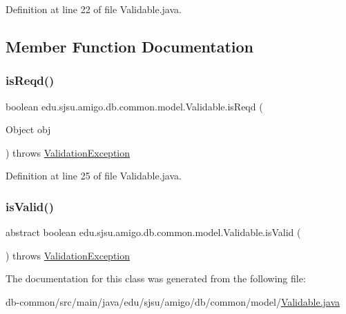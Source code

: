 Definition at line 22 of file Validable.\+java.



\subsection{Member Function Documentation}
\mbox{\label{classedu_1_1sjsu_1_1amigo_1_1db_1_1common_1_1model_1_1_validable_ab9527f96d7d64d5eda700827967002c0}} 
\subsubsection{\texorpdfstring{is\+Reqd()}{isReqd()}}
{\footnotesize\ttfamily boolean edu.\+sjsu.\+amigo.\+db.\+common.\+model.\+Validable.\+is\+Reqd (\begin{DoxyParamCaption}\item[{Object}]{obj }\end{DoxyParamCaption}) throws \hyperlink{classedu_1_1sjsu_1_1amigo_1_1db_1_1common_1_1model_1_1_validation_exception}{Validation\+Exception}\hspace{0.3cm}{\ttfamily [protected]}}



Definition at line 25 of file Validable.\+java.

\mbox{\label{classedu_1_1sjsu_1_1amigo_1_1db_1_1common_1_1model_1_1_validable_af1ff212bfc820b4fc62de1be676ef018}} 
\subsubsection{\texorpdfstring{is\+Valid()}{isValid()}}
{\footnotesize\ttfamily abstract boolean edu.\+sjsu.\+amigo.\+db.\+common.\+model.\+Validable.\+is\+Valid (\begin{DoxyParamCaption}{ }\end{DoxyParamCaption}) throws \hyperlink{classedu_1_1sjsu_1_1amigo_1_1db_1_1common_1_1model_1_1_validation_exception}{Validation\+Exception}\hspace{0.3cm}{\ttfamily [abstract]}}



The documentation for this class was generated from the following file\+:\begin{DoxyCompactItemize}
\item 
db-\/common/src/main/java/edu/sjsu/amigo/db/common/model/\hyperlink{_validable_8java}{Validable.\+java}\end{DoxyCompactItemize}
